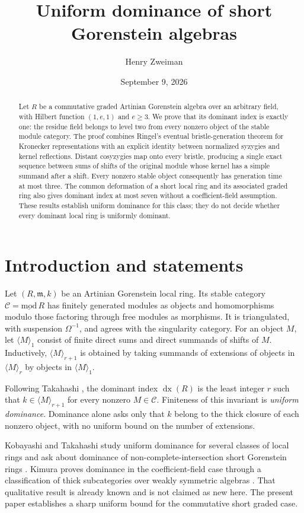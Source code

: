 \documentclass[11pt]{article}
\title{Uniform dominance of short Gorenstein algebras}
\author{Henry Zweiman}
\date{September 9, 2026}
\theoremstyle{definition}\newtheorem{definition}[theorem]{Definition}
\theoremstyle{remark}\newtheorem{remark}[theorem]{Remark}
\newcommand{\m}{\mathfrak m}
\newcommand{\dx}{\operatorname{dx}}
\newcommand{\C}{\mathcal C}
\begin{document}
\maketitle
\begin{abstract}
Let $R$ be a commutative graded Artinian Gorenstein algebra over an arbitrary field, with Hilbert function $(1,e,1)$ and $e\ge3$. We prove that its dominant index is exactly one: the residue field belongs to level two from every nonzero object of the stable module category. The proof combines Ringel's eventual bristle-generation theorem for Kronecker representations with an explicit identity between normalized syzygies and kernel reflections. Distant cosyzygies map onto every bristle, producing a single exact sequence between sums of shifts of the original module whose kernel has a simple summand after a shift. Every nonzero stable object consequently has generation time at most three. The common deformation of a short local ring and its associated graded ring also gives dominant index at most seven without a coefficient-field assumption. These results establish uniform dominance for this class; they do not decide whether every dominant local ring is uniformly dominant.
\end{abstract}

\section{Introduction and statements}
Let $(R,\m,k)$ be an Artinian Gorenstein local ring. Its stable category $\C=\underline{\mathrm{mod}}\,R$ has finitely generated modules as objects and homomorphisms modulo those factoring through free modules as morphisms. It is triangulated, with suspension $\Omega^{-1}$, and agrees with the singularity category. For an object $M$, let $\langle M\rangle_1$ consist of finite direct sums and direct summands of shifts of $M$. Inductively, $\langle M\rangle_{r+1}$ is obtained by taking summands of extensions of objects in $\langle M\rangle_r$ by objects in $\langle M\rangle_1$.

Following Takahashi \cite{T}, the dominant index $\dx(R)$ is the least integer $r$ such that $k\in\langle M\rangle_{r+1}$ for every nonzero $M\in\C$. Finiteness of this invariant is \emph{uniform dominance}. Dominance alone asks only that $k$ belong to the thick closure of each nonzero object, with no uniform bound on the number of extensions.

Kobayashi and Takahashi study uniform dominance for several classes of local rings and ask about dominance of non-complete-intersection short Gorenstein rings \cite[Question 7.1]{KT}. Kimura proves dominance in the coefficient-field case through a classification of thick subcategories over weakly symmetric algebras \cite[Theorem 7.3]{K}. That qualitative result is already known and is not claimed as new here. The present paper establishes a sharp uniform bound for the commutative short graded case.
\end{document}
